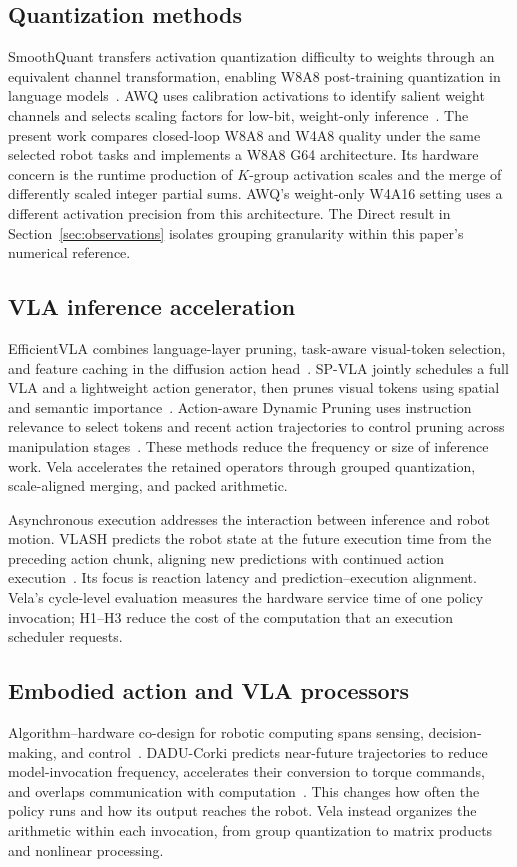 \documentclass[journal,10pt]{IEEEtran}
\begin{document}
\subsection{Quantization methods}
SmoothQuant transfers activation quantization difficulty to weights through an equivalent channel transformation, enabling W8A8 post-training quantization in language models~\cite{smoothquant}. AWQ uses calibration activations to identify salient weight channels and selects scaling factors for low-bit, weight-only inference~\cite{awq}. The present work compares closed-loop W8A8 and W4A8 quality under the same selected robot tasks and implements a W8A8 G64 architecture. Its hardware concern is the runtime production of $K$-group activation scales and the merge of differently scaled integer partial sums. AWQ's weight-only W4A16 setting uses a different activation precision from this architecture. The Direct result in Section~\ref{sec:observations} isolates grouping granularity within this paper's numerical reference.

\subsection{VLA inference acceleration}
EfficientVLA combines language-layer pruning, task-aware visual-token selection, and feature caching in the diffusion action head~\cite{yang2025efficientvla}. SP-VLA jointly schedules a full VLA and a lightweight action generator, then prunes visual tokens using spatial and semantic importance~\cite{li2026spvla}. Action-aware Dynamic Pruning uses instruction relevance to select tokens and recent action trajectories to control pruning across manipulation stages~\cite{pei2026adp}. These methods reduce the frequency or size of inference work. Vela accelerates the retained operators through grouped quantization, scale-aligned merging, and packed arithmetic.

Asynchronous execution addresses the interaction between inference and robot motion. VLASH predicts the robot state at the future execution time from the preceding action chunk, aligning new predictions with continued action execution~\cite{tang2025vlash}. Its focus is reaction latency and prediction--execution alignment. Vela's cycle-level evaluation measures the hardware service time of one policy invocation; H1--H3 reduce the cost of the computation that an execution scheduler requests.

\subsection{Embodied action and VLA processors}
Algorithm--hardware co-design for robotic computing spans sensing, decision-making, and control~\cite{yan2025robotic_computing}. DADU-Corki predicts near-future trajectories to reduce model-invocation frequency, accelerates their conversion to torque commands, and overlaps communication with computation~\cite{huang2025daducorki}. This changes how often the policy runs and how its output reaches the robot. Vela instead organizes the arithmetic within each invocation, from group quantization to matrix products and nonlinear processing.
\end{document}
